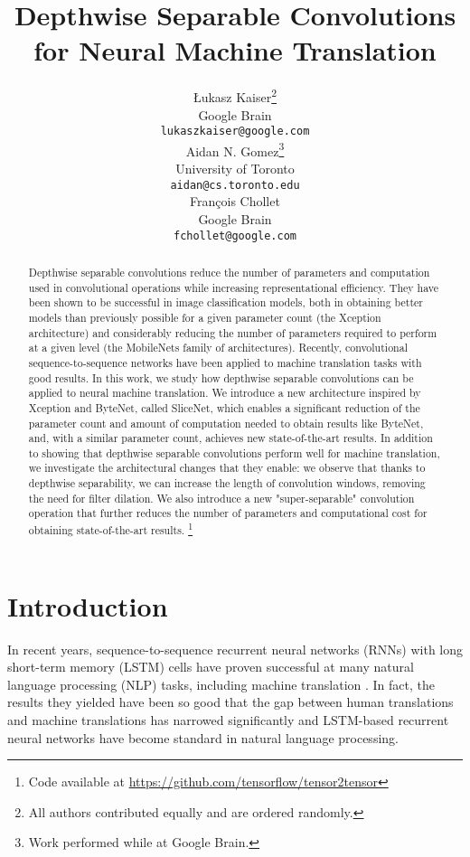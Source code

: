 \documentclass{article}
\title{Depthwise Separable Convolutions for Neural Machine Translation}
\author{
  {\L}ukasz Kaiser\thanks{All authors contributed equally and are ordered randomly.}\\
  Google Brain\\
  \texttt{lukaszkaiser@google.com} \\
  \And
  Aidan N. Gomez\samethanks[1]\hspace{1.7mm}\thanks{Work performed while at Google Brain.}\\
  University of Toronto\\
  \texttt{aidan@cs.toronto.edu} \\
  \And
  Fran\c{c}ois Chollet\samethanks[1]\\
  Google Brain\\
  \texttt{fchollet@google.com} \\
}
\newcommand\blfootnote[1]{\begingroup
  \renewcommand\thefootnote{}\footnote{#1}\addtocounter{footnote}{-1}\endgroup
}
\begin{document}
\maketitle

\begin{abstract}
Depthwise separable convolutions reduce the number of parameters and computation used in convolutional operations while increasing representational efficiency.
They have been shown to be successful in image classification models, both in obtaining better models than previously possible for a given parameter count (the Xception architecture) and considerably reducing the number of parameters required to perform at a given level (the MobileNets family of architectures). Recently, convolutional sequence-to-sequence networks have been applied to machine translation tasks with good results. In this work, we study how depthwise separable convolutions can be applied to neural machine translation. We introduce a new architecture inspired by Xception and ByteNet, called SliceNet, which enables a significant reduction of the parameter count and amount of computation needed to obtain results like ByteNet, and, with a similar parameter count, achieves new state-of-the-art results.
In addition to showing that depthwise separable convolutions perform well for machine translation, we investigate the architectural changes that they enable: we observe that thanks to depthwise separability, we can increase the length of convolution windows, removing the need for filter dilation. We also introduce a new "super-separable" convolution operation that further reduces the number of parameters and computational cost for obtaining state-of-the-art results.
\blfootnote{Code available at \url{https://github.com/tensorflow/tensor2tensor}}
\end{abstract}

\section{Introduction}

In recent years, sequence-to-sequence recurrent neural networks (RNNs) with long short-term memory (LSTM) cells \citep{hochreiter1997}
have proven successful at many natural language processing (NLP) tasks, including machine translation
\citep{sutskever14,bahdanau2014neural,cho2014learning}. In fact, the results they yielded have been so good that
the gap between human translations and machine translations has narrowed significantly \cite{GNMT} and LSTM-based recurrent
neural networks have become standard in natural language processing.
\end{document}
